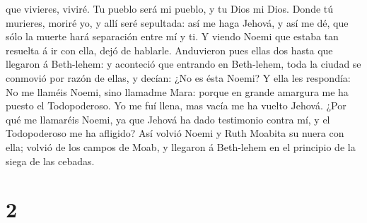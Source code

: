 que vivieres, viviré. Tu pueblo será mi pueblo, y tu Dios mi Dios.
 Donde tú murieres, moriré yo, y allí seré sepultada: así
me haga Jehová, y así me dé, que sólo la muerte hará separación entre mí
y ti.  Y viendo Noemi que estaba tan resuelta á ir con
ella, dejó de hablarle.  Anduvieron pues ellas dos hasta
que llegaron á Beth-lehem: y aconteció que entrando en Beth-lehem, toda
la ciudad se conmovió por razón de ellas, y decían: ¿No es ésta Noemi?
 Y ella les respondía: No me llaméis Noemi, sino llamadme
Mara: porque en grande amargura me ha puesto el Todopoderoso.
 Yo me fuí llena, mas vacía me ha vuelto Jehová. ¿Por qué
me llamaréis Noemi, ya que Jehová ha dado testimonio contra mí, y el
Todopoderoso me ha afligido?  Así volvió Noemi y Ruth
Moabita su nuera con ella; volvió de los campos de Moab, y llegaron á
Beth-lehem en el principio de la siega de las cebadas.

\hypertarget{section-1}{%
\section{2}\label{section-1}}

